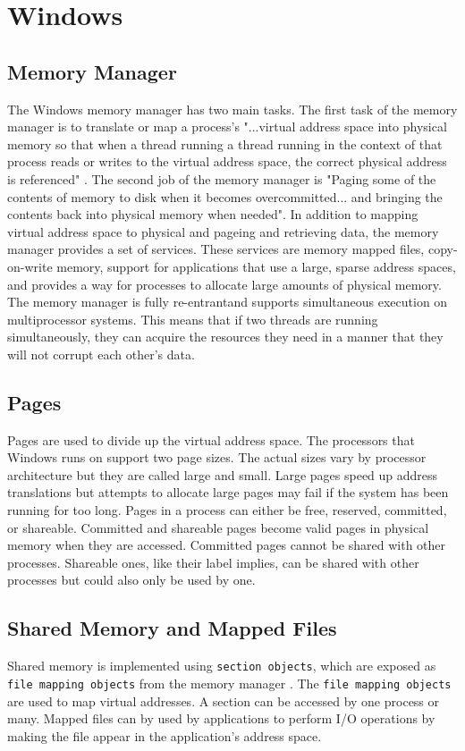 \section{Windows}
\subsection{Memory Manager}
The Windows memory manager has two main tasks. The first task of the memory manager is to translate or map a process's "...virtual address space into physical memory so that when a thread running a thread running in the context of that process reads or writes to the virtual address space, the correct physical address is referenced" \cite{WindowsText}. The second job of the memory manager is "Paging some of the contents of memory to disk when it becomes overcommitted... and bringing the contents back into physical memory when needed"\cite{WindowsText}. In addition to mapping virtual address space to physical and pageing and retrieving data, the memory manager provides a set of services. These services are memory mapped files, copy-on-write memory, support for applications that use a large, sparse address spaces, and provides a way for processes to allocate large amounts of physical memory\cite{WindowsText}. The memory manager is fully re-entrantand supports
simultaneous execution on multiprocessor systems\cite{WindowsText}. This means that if two threads are running simultaneously, they can acquire the resources they need in a manner that they will not corrupt each other's data.


\subsection{Pages}
Pages are used to divide up the virtual address space. The processors that Windows runs on support two page sizes. The actual sizes vary by processor architecture but they are called large and small\cite{WindowsText}. Large pages speed up address translations but attempts to allocate large pages may fail if the system has been running for too long. Pages in a process can either be free, reserved, committed, or shareable. Committed and shareable pages become valid pages in physical memory when they are accessed\cite{WindowsText}. Committed pages cannot be shared with other processes. Shareable ones, like their label implies, can be shared with other processes but could also only be used by one.

\subsection{Shared Memory and Mapped Files}
Shared memory is implemented using \lstinline{section objects}, which are exposed as \lstinline{file mapping objects} from the memory manager \cite{WindowsText}. The \lstinline{file mapping objects} are used to map virtual addresses. A section can be accessed by one process or many. Mapped files can by used by applications to perform I/O operations by making the file appear in the application's address space\cite{WindowsText}.
